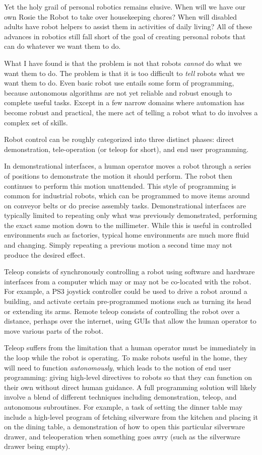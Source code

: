 \documentclass[10pt,twocolumn]{article}
\begin{document}
Yet the holy grail of personal robotics remains elusive. When will we have our own Rosie the Robot to take over housekeeping chores? When will disabled adults have robot helpers to assist them in activities of daily living? All of these advances in robotics still fall short of the goal of creating personal robots that can do whatever we want them to do.

What I have found is that the problem is not that robots {\em cannot} do what we want them to do. The problem is that it is too difficult to {\em tell} robots what we want them to do. Even basic robot use entails some form of programming, because autonomous algorithms are not yet reliable and robust enough to complete useful tasks. Except in a few narrow domains where automation has become robust and practical, the mere act of telling a robot what to do involves a complex set of skills.

Robot control can be roughly categorized into three distinct phases: direct demonstration, tele-operation (or teleop for short), and end user programming.

In demonstrational interfaces, a human operator moves a robot through a series of positions to demonstrate the motion it should perform. The robot then continues to perform this motion unattended. This style of programming is common for industrial robots, which can be programmed to move items around on conveyor belts or do precise assembly tasks. Demonstrational interfaces are typically limited to repeating only what was previously demonstrated, performing the exact same motion down to the millimeter. While this is useful in controlled environments such as factories, typical home environments are much more fluid and changing. Simply repeating a previous motion a second time may not produce the desired effect.

Teleop consists of synchronously controlling a robot using software and hardware interfaces from a computer which may or may not be co-located with the robot. For example, a PS3 joystick controller could be used to drive a robot around a building, and activate certain pre-programmed motions such as turning its head or extending its arms. Remote teleop consists of controlling the robot over a distance, perhaps over the internet, using GUIs that allow the human operator to move various parts of the robot.

Teleop suffers from the limitation that a human operator must be immediately in the loop while the robot is operating. To make robots useful in the home, they will need to function {\em autonomously}, which leads to the notion of end user programming: giving high-level directives to robots so that they can function on their own without direct human guidance.  A full programming solution will likely involve a blend of different techniques including demonstration, teleop, and autonomous subroutines. For example, a task of setting the dinner table may include a high-level program of fetching silverware from the kitchen and placing it on the dining table, a demonstration of how to open this particular silverware drawer, and teleoperation when something goes awry (such as the silverware drawer being empty).
\end{document}
